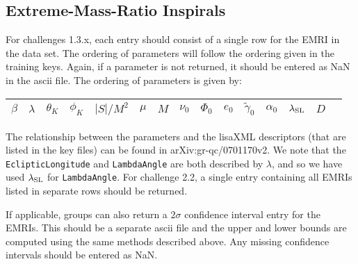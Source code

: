 \documentclass[11pt]{article}
\begin{document}
\subsection{Extreme-Mass-Ratio Inspirals}
For challenges 1.3.x, each entry should consist of a single row for the EMRI in the data set. The ordering of parameters will follow the ordering given in the training keys. Again, if a parameter is not returned, it should be entered as NaN in the ascii file. The ordering of parameters is given by:
\begin{table}[h]
	\begin{tabular}{ccccccccccccccc}
		\hline
		$\beta$ & $\lambda$ & $\theta_K$ & $\phi_K$ & $|S|/M^2$ & $\mu$ & $M$ & $\nu_0$ & $\Phi_0$ & $e_0$ & $\tilde{\gamma}_0$ & $\alpha_0$ & $\lambda_{\rm SL}$ & $D$ \\
		\hline
	\end{tabular}
	\label{emrientries}
\end{table}
The relationship between the parameters and the lisaXML descriptors (that are listed in the key files) can be found in arXiv:gr-qc/0701170v2. We note that the {\tt EclipticLongitude} and {\tt LambdaAngle} are both described by $\lambda$, and so we have used $\lambda_{\rm SL}$ for {\tt LambdaAngle}. For challenge 2.2, a single entry containing all EMRIs listed in separate rows should be returned.

If applicable, groups can also return a $2\sigma$ confidence interval entry for the EMRIs. This should be a separate ascii file and the upper and lower bounds are computed using the same methods described above. Any missing confidence intervals should be entered as NaN.
\end{document}

